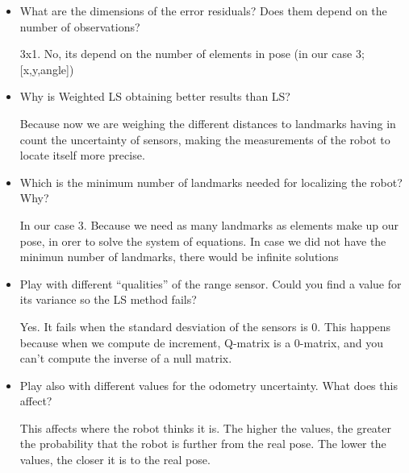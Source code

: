 \documentclass[11pt]{article}
\begin{document}
\begin{itemize}
\item
  What are the dimensions of the error residuals? Does them depend on
  the number of observations?

  3x1. No, its depend on the number of elements in pose (in our case 3;
  {[}x,y,angle{]})
\item
  Why is Weighted LS obtaining better results than LS?

  Because now we are weighing the different distances to landmarks
  having in count the uncertainty of sensors, making the measurements of
  the robot to locate itself more precise.
\item
  Which is the minimum number of landmarks needed for localizing the
  robot? Why?

  In our case 3. Because we need as many landmarks as elements make up
  our pose, in orer to solve the system of equations. In case we did not
  have the minimun number of landmarks, there would be infinite
  solutions
\item
  Play with different ``qualities'' of the range sensor. Could you find
  a value for its variance so the LS method fails?

  Yes. It fails when the standard desviation of the sensors is 0. This happens because when we compute de increment, Q-matrix is a 0-matrix, and you can't compute the inverse of a null matrix.
\item
  Play also with different values for the odometry uncertainty. What
  does this affect?

  This affects where the robot thinks it is. The higher the values, the
  greater the probability that the robot is further from the real pose. 
  The lower the values, the closer it is to the real pose.
\end{itemize}


    
    
    
\end{document}
